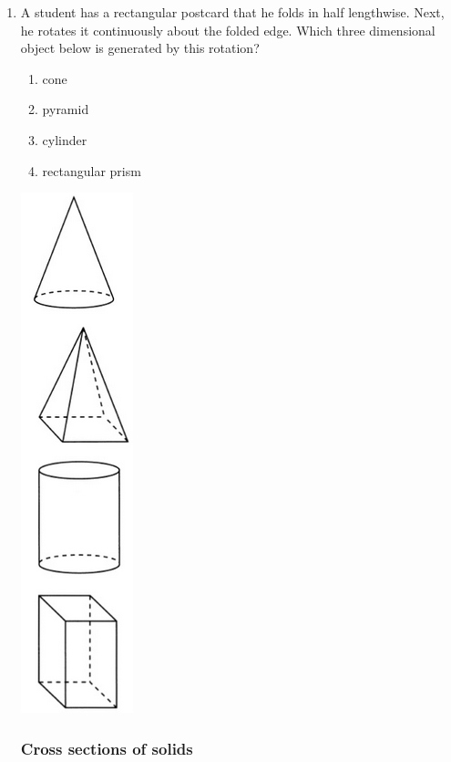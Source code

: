 \documentclass[12pt, twoside]{article}
\begin{document}
\begin{enumerate}
\item A student has a rectangular postcard that he folds in half lengthwise. Next, he rotates it continuously about the folded edge. Which three dimensional object below is generated by this rotation?
    \begin{multicols}{2}
    \begin{enumerate}
      \item cone
      \item pyramid
      \item cylinder
      \item rectangular prism
    \end{enumerate}
    \includegraphics[scale=0.5]{solids.png}
    \end{multicols}

\newpage
\subsubsection*{Cross sections of solids} %
    

\end{enumerate}
\end{document}
